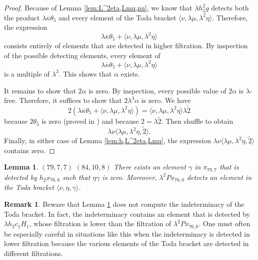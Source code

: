 \documentclass{amsart}
\newtheorem{lemma}[thm]{Lemma}
\theoremstyle{definition}
\newtheorem{rmk}[thm]{Remark}
\newcommand{\hsf}{\widetilde{2}}
\newcommand{\lemdeg}[1]{$({#1})$}
\newcommand{\kappabar}{\overline{\kappa}}
\begin{document}
\begin{proof}
Because of Lemma \ref{lem:L^2eta,Lmu,nu},
we know that $\lambda h_5^2 g$ detects both
the product $\lambda \kappabar \theta_5$ and every element of
the Toda bracket $\langle \nu, \lambda \mu, \lambda^2 \eta \rangle$.
Therefore, the expression
$$\lambda \kappabar \theta_5 + \langle \nu, \lambda \mu, \lambda^2 \eta \rangle$$
consists entirely of elements that are 
detected in higher filtration.
By inspection of the possible detecting elements, 
every element of
\[
\lambda \kappabar \theta_5 + \langle \nu, \lambda \mu, \lambda^2 \eta \rangle 
\]
is a multiple of $\lambda^3$.
This shows that $\alpha$ exists.

It remains to show that $2 \alpha$ is zero.
By inspection, every possible value
of $2 \alpha$ is $\lambda$-free.  Therefore, it suffices to show
that $2 \lambda^3 \alpha$ is zero.  
We have
\[
2 \left( \lambda \kappabar \theta_5 + \langle \nu, \lambda \mu, \lambda^2 \eta \rangle \right) = 
\langle \nu, \lambda \mu, \lambda^2 \eta \rangle \lambda \hsf 
\]
because $2 \theta_5$ is zero 
(proved in \cite{Xu16})
and because $2 = \lambda \hsf$.
Then shuffle to obtain
\[
\lambda \nu \langle \lambda \mu, \lambda^2 \eta, \hsf \rangle.
\]
Finally, 
in either case of Lemma \ref{lem:h,L^2eta,Lmu}, the expression
$\lambda \nu \langle \lambda \mu, \lambda^2 \eta, \hsf \rangle$
contains zero.
\end{proof}


\begin{lemma}
\label{lem:nu,eta,h2x76,6}
\lemdeg{79, 7, 7}
\lemdeg{84, 10, 8}
There exists an element $\gamma$ in $\pi_{79,7}$ that is detected by
$h_2 x_{76,6}$ such that $\eta \gamma$ is zero.
Moreover,
$\lambda^2 P x_{76,6}$ detects an element in the Toda bracket
$\langle \nu, \eta, \gamma \rangle$.
\end{lemma}

\begin{rmk}
\label{rem:nu,eta,h2x76,6}
Beware that Lemma \ref{lem:nu,eta,h2x76,6} does not compute the
indeterminacy of the Toda bracket.
In fact, the indeterminacy
contains an element that is detected by $\lambda h_2 c_1 H_1$,
whose filtration is lower than the filtration of $\lambda^2 P x_{76,6}$.
One must often be especially careful in situations like this
when the indeterminacy
is detected in lower filtration because the various elements of the
Toda bracket are detected in different filtrations.
\end{rmk}
\end{document}
